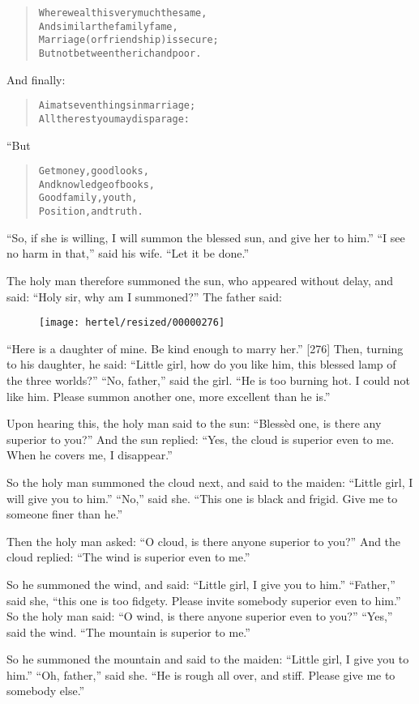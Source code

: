 \documentclass[article, twoside, 10pt]{memoir}
\renewenvironment{verbatim}{%
\begin{quote}%
\vskip -10pt%
\begin{alltt}\normalfont\small}{\end{alltt}%
\end{quote}%
\vskip -10pt
} %
\begin{document}
\begin{verbatim}
Where wealth is very much the same,
And similar the family fame,
Marriage (or friendship) is secure;
But not between the rich and poor.
\end{verbatim}
And finally:

\begin{verbatim}
Aim at seven things in marriage;
All the rest you may disparage:
\end{verbatim}
“But

\begin{verbatim}
Get money, good looks,
And knowledge of books,
Good family, youth,
Position, and truth.
\end{verbatim}
``So, if she is willing, I will summon the blessed sun, and give her to him.''
``I see no harm in that,'' said his wife. ``Let it be done.''

The holy man therefore summoned the sun, who appeared without
delay, and said: ``Holy sir, why am I summoned?'' The father said:
\begin{figure}[p]\texttt{[image: hertel/resized/00000276]}\end{figure}``Here is a daughter of mine. Be kind enough to marry her.'' [276]
Then, turning to his daughter, he said:
``Little girl, how do you like him, this blessed lamp of the three worlds?''
``No, father,'' said the girl.
``He is too burning hot. I could not like him. Please summon another one, more excellent than he is.''

Upon hearing this, the holy man said to the sun:
``Blessèd one, is there any superior to you?'' And the sun replied:
``Yes, the cloud is superior even to me. When he covers me, I disappear.''

So the holy man summoned the cloud next, and said to the maiden:
``Little girl, I will give you to him.'' ``No,'' said she.
``This one is black and frigid. Give me to someone finer than he.''

Then the holy man asked:
``O cloud, is there anyone superior to you?'' And the cloud
replied: ``The wind is superior even to me.''

So he summoned the wind, and said:
``Little girl, I give you to him.'' ``Father,'' said she,
``this one is too fidgety. Please invite somebody superior even to him.''
So the holy man said:
``O wind, is there anyone superior even to you?'' ``Yes,'' said the
wind. ``The mountain is superior to me.''

So he summoned the mountain and said to the maiden:
``Little girl, I give you to him.'' ``Oh, father,'' said she.
``He is rough all over, and stiff. Please give me to somebody else.''
\end{document}
